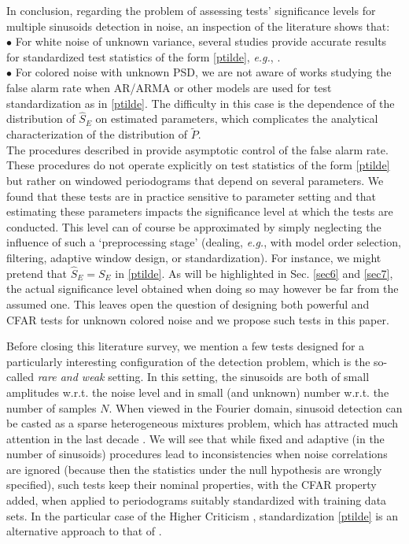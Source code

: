 \documentclass[journal]{IEEEtran}
\begin{document}
In conclusion, regarding the problem of assessing tests' significance levels for multiple sinusoids detection in noise, an inspection of the literature shows that:\\
$\bullet$	For white noise of unknown variance, several studies provide accurate results for standardized test statistics of the form \eqref{ptilde}, \textit{e.g.},    \cite{Shimshoni_1971, Siegel_1980,Bolviken_1983a, Bolviken_1983b, Chiu_1989}.\\
	$\bullet$ For colored noise with unknown { PSD}, we are not aware of works studying the  false alarm rate when AR/ARMA or other models are used for test standardization as in \eqref{ptilde}. The difficulty in this case is the dependence of the distribution of $\widehat{S}_E$ on  estimated   {
	parameters, which complicates} the analytical characterization of the  distribution of $\widetilde{P}$.\\
The procedures described in \cite{Hannan_1961, Bhansali_1979,Priestley_1981}  provide asymptotic control of the false alarm rate. These procedures do not operate explicitly on test statistics of the form \eqref{ptilde} but rather on windowed periodograms that depend on several parameters. We found that {  these tests are  in practice sensitive to  parameter}  setting
{ and that
estimating these parameters  impacts the significance level at which the tests are conducted}. 
This  level  can of course be approximated by simply neglecting  { the influence of 
such} a `preprocessing stage' { (dealing, \textit{e.g.}, with model order selection, filtering, adaptive window design, or standardization)}. For instance,  { we might pretend that $\widehat{S}_E={S}_E$ in \eqref{ptilde}.
As  will be highlighted in  Sec. \ref{sec6} and \ref{sec7}, the actual significance level obtained when doing so may  however be} far from the assumed one. This leaves open the question of designing both powerful and CFAR tests for unknown colored noise and we propose  such tests in this paper. 

Before closing this literature survey, we mention a few tests designed for a particularly interesting configuration of the detection problem,   
which is the so-called \textit {rare and weak} setting. In this setting, the sinusoids 
are both of small amplitudes { w.r.t. the noise level} and in small (and unknown) number w.r.t. the number of samples $N$. 
{   When viewed in the Fourier domain, sinusoid detection can } be casted as a sparse heterogeneous mixtures problem, which has attracted much attention in the last decade {\cite{Donoho_2004, Ingster_2010, Walther_2011, Moscovich_2016, Gontscharuk_2016}}. { We will see that while  fixed and adaptive  (in the number of sinusoids) procedures  lead to inconsistencies  when  noise correlations are ignored (because then the statistics under the null hypothesis are wrongly specified), such tests keep their nominal properties, with the CFAR property added, when applied to periodograms  suitably standardized with training data sets. In the particular case of the Higher Criticism \cite{Donoho_2004}, standardization \eqref{ptilde} is  an alternative approach
 to that of \cite{Hall_2010}.}   
\end{document}
